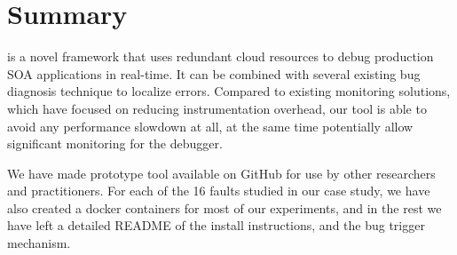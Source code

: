 

\section{Summary}
\label{sec:parikshanSummary}

\parikshan is a novel framework that uses redundant cloud resources to debug production SOA applications in real-time.
It can be combined with several existing bug diagnosis technique to localize errors.
Compared to existing monitoring solutions, which have focused on reducing instrumentation overhead, our tool is able to avoid any performance slowdown at all, at the same time potentially allow significant monitoring for the debugger.

We have made \parikshan prototype tool available on GitHub for use by other researchers and practitioners.
For each of the 16 faults studied in our case study, we have also created a docker containers for most of our experiments, and in the rest we have left a detailed README of the install instructions, and the bug trigger mechanism.

